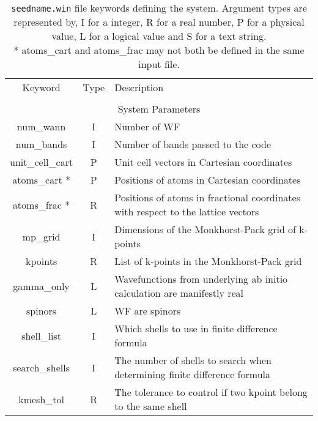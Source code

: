 \begin{table}
\begin{center}
\begin{tabular}{|c|c|p{6cm}|}
\hline
Keyword & Type & Description \\
        &      &             \\
\hline\hline
\multicolumn{3}{|c|}{System Parameters} \\
\hline
{\sc num\_wann }   & I & Number of WF \\
{\sc num\_bands }   & I & Number of bands passed to the code \\
{\sc unit\_cell\_cart }   & P & Unit cell vectors in Cartesian coordinates \\
{\sc atoms\_cart }*   & P & Positions of atoms in Cartesian coordinates \\
{\sc atoms\_frac }*   & R & Positions of atoms in fractional
coordinates with respect to the lattice vectors \\
{\sc mp\_grid }   & I & Dimensions of the Monkhorst-Pack grid of
k-points \\
{\sc kpoints }   & R & List of k-points in the Monkhorst-Pack grid \\
{\sc gamma\_only} & L & Wavefunctions from underlying ab initio
calculation are manifestly real \\
{\sc spinors} & L & WF are spinors \\
{\sc shell\_list }   & I & Which shells to use in finite difference formula \\
{\sc search\_shells }   & I & The number of shells to search when
determining finite difference formula \\
{\sc kmesh\_tol } & R & The tolerance to control if two kpoint belong to the same shell \\
\hline
\end{tabular}
\caption[Parameter file keywords controlling system parameters.]
{{\tt seedname.win} file keywords defining the system.  Argument types
are represented by, I for a integer, R for a real number, P for a
physical value, L for a logical value and S for a text string.\\
 {\footnotesize
* {\sc atoms\_cart } and  {\sc atoms\_frac } may not both be defined in
the same input file. }} 
\label{parameter_keywords1}
\end{center}
\end{table}


